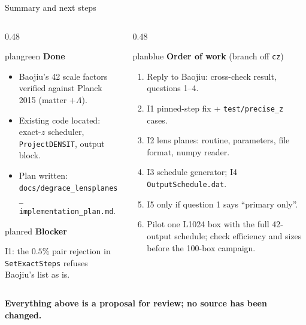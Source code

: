 \documentclass[UTF8]{beamer}
\begin{document}
\begin{frame}{Summary and next steps}
  \footnotesize
  \begin{columns}[T,totalwidth=\textwidth]
    \begin{column}{0.48\textwidth}
      \begin{phasebox}[colback=plangreen!6]{plangreen}
        {\color{plangreen}\bfseries Done}\par\smallskip
        \begin{itemize}\setlength\itemsep{0.2em}
          \item Baojiu's 42 scale factors verified against Planck 2015 (matter $+\Lambda$).
          \item Existing code located: exact-$z$ scheduler, \texttt{ProjectDENSIT}, output block.
          \item Plan written: \texttt{docs/degrace\_lensplanes\_}\\\texttt{implementation\_plan.md}.
        \end{itemize}
      \end{phasebox}
      \vspace{0.4ex}
      \begin{phasebox}[colback=planred!5]{planred}
        {\color{planred}\bfseries Blocker}\par\smallskip
        I1: the $0.5\%$ pair rejection in \texttt{SetExactSteps} refuses Baojiu's list as is.
      \end{phasebox}
    \end{column}
    \hfill
    \begin{column}{0.48\textwidth}
      \begin{phasebox}{planblue}
        {\color{planblue}\bfseries Order of work} (branch off \texttt{cz})\par\smallskip
        \begin{enumerate}\setlength\itemsep{0.2em}
          \item Reply to Baojiu: cross-check result, questions 1--4.
          \item I1 pinned-step fix + \texttt{test/precise\_z} cases.
          \item I2 lens planes: routine, parameters, file format, numpy reader.
          \item I3 schedule generator; I4 \texttt{OutputSchedule.dat}.
          \item I5 only if question 1 says ``primary only''.
          \item Pilot one L1024 box with the full 42-output schedule; check
                efficiency and sizes before the 100-box campaign.
        \end{enumerate}
      \end{phasebox}
    \end{column}
  \end{columns}
  \vfill
  \centering
  \textbf{Everything above is a proposal for review; no source has been changed.}
\end{frame}
\end{document}
